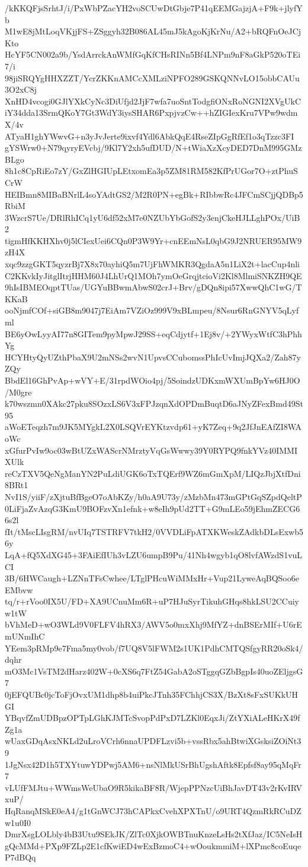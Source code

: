 /kKKQFjsSrhtJ/i/PxWbPZacYH2voSCUwDtGbje7P41qEEMGajzjA+F9k+jlyfYb
M1wE8jMtLoqVKjjFS+ZSggyh32B086AL45mJ5kAgoKjKrNu/A2+bRQFnOeJCjKto
HcYF5CN002a9b/YsdArrckAnWMfGqKfCHsRINn5Bf4LNPm9nF8aGkP520oTEi7/i
98jiSRQYgHHXZZT/YcrZKKnAMCcXMLziNPFO289GSKQNNvLO15obbCAUu3O2xC8j
XnHD4vcogi0GJlYXkCyNc3DiUfjd2JjF7wfa7uoSntTodgfiONxRoNGNI2XVgUkC
iY34dda13SrmQKoY7Gt3WdY3iysSHAR6PxpjvzCw++hZIGIexKru7VPw9wdmX/4v
ATyaH1ghYWwvG+n3yJvJerte9ixvf4Ydl6AbkQqE4RseZIpGgRfEf1o3qTzzc3FI
gYSWrw0+N79qyryEVcbj/9Kl7Y2xh5ufDUD/N+tWiaXzXcyDED7DnM995GMzBLgo
8h1c8CpRiEo7zY/GxZlHGIUpLEtxomEa3p5ZM81RM582KfPrUGor7O+ztPhuSCrW
HEIBmn8MIBaBNrlL4soYAdtGS2/M2R0PN+egBk+RIbbwRc4JFCmSCjjQDBp5RbiM
3WzcrS7Ue/DRlRhICq1yU6df52xM7e0NZUbYbGofS2y3enjCkeHJLLghPOx/UiB2
tigmHfKKHXhv0j5lCIexUei6CQn0P3W9Yr+cnEEmNsL0qbG9J2NRUER95MW9zH4X
xqc9zzgGKT5qyzrBj7X8x70ayhiQ5m7UjFhWMKR3QgdaA5n1LiX2t+lacCup4nli
C2KKvkIyJitglItrjHHM60J4LhUrQ1MOh7ymOeGrqjtcioVi2Kl8MlmiSNKZH9QE
9hIsIBMEOqptTUas/UGYuBBwmAbwS02crJ+Brv/gDQn8ipi57XwwQhC1wG/TKKaB
ooNjmfCOf+siGB8m9047j7EiAm7VZiOz999V9xBLmpeu/8Nsur6RnGNYV5qLyfml
BE6yOwLyyAI77n8GITem9pyMpwJ29SS+eqCdjytf+1Ej8v/+2YWyxWtfC3hPhhYg
HCYHtyQyUZthPbaX9U2mNSs2wvN1UpvsCCubomssPhIcUvImjJQXa2/Zah87yZQy
BbdEl16GhPvAp+wVY+E/31rpdWOio4pj/5SoindzUDKxmWXUmBpYw6HJ0O/M0gre
k70wszmn0XAkc27pku8SOzxLS6V3xFPJzqnXdOPDmBuqtD6aJNyZFexBmd49St95
aWoETeqzh7m9JK5MYgkL2X0LSQVrEYKtzvdp61+yK7Zeq+9q2JfJnEAfZI8WAoWc
xGfurPvIw9oc03wBtUZxWAScrNMrztyVqGsWwwy39Y0RYPQ9fnkYVz40IMMIXUlk
reCzTXV5QeNgManYN2PuLdiUGK6oTxTQErf9WZ6mGmXpM/LIQzJbjXtfDni8BRt1
NvI1S/yiiF/zXjtuBfBgeO7oAbKZy/h0aA9U73y/zMzbMn473mGPtGqSZpdQeltP
0LiFjaZvAzqG3KmU9BOFzvXn1efnk+w8eIh9pUd2TT+G9mLEo59jEhmZECG66s2l
fIt/tMscLIsgRM/nvUIq7TSTRFV7tkH2/0VVDLiFpATXKWeskZAdkbDLsExwb56y
LqA+fQ5XdXG45+3FAiEfIUh3vLZU6umpB9Pu/41Nh4wgyb1qO8lvfAWzdS1vuLCI
3B/6HWCaugh+LZNnTFsCwhee/LTglPHcuWiMMxHr+Vup21LyweAqBQSoo6eEMbvw
tq/r+rVoo0IX5U/FD+XA9UCnuMm6R+uP7HJuSyrTikuhGHqs8hkLSU2CCuiyw1tW
bVhMeD+wO3WLd9V0FLFV4hRX3/AWV5o0mxXhj9MfYZ+dnBSErMIf+U6rEmUNmIhC
YEem3pRMp9e7Fma5my0vob/f7UQ8V5lFWM2s1UK1PdhCMTQSfgyRR20oSk4/dqhr
mO3Mc1VsTM2dHarz402W+0cXS6q7FtZ54GabA2oSTggqGZbBgpIs40uoZEljgsG7
0jEFQUBc0jcToFjOvxUM1dhp8b4uiPkcJTnh35FChhjCS3X/BzXt8sFxSUKkUHGI
YBqvfZmUDBpzOPTpLGhKJMTcSvopPdPxD7LZKl0EqxJi/ZtYXiALeHKrX49fZg1a
wUaxGDqAsxNKLd2uLroVCrh6nnaUPDFLzvi5b+vssRbx5ahBtwiXGsksiZOiNt39
1JgNsx42D1h5TXYtuwYDPwj5AM6+nsNlMkUSrBhUgshAftk8Epfsf8ay95qMqFr7
vLUfFMJtu+WWmsWeUbaO9R5kikaBF8R/WjepPPNzcUiBhJavDT43v2rKvIRVxuP/
HqRanqMSkE0eA4/g1tGnWCJ73hCAPkxCvehXPXTnU/o9URT4QzmRkRCuDZw1u0I0
DmrXsgLOLbly4bB3Utu9SEkJK/ZlTc0XjkOWBTnuKnzeLsHs2tXfJaz/IC5NeIsH
gQcMMd+PXp9FZLp2E1cfKwiED4wExBzmoC4+wOoukmmiM+lXPmc8coEuqeP7dBQq
